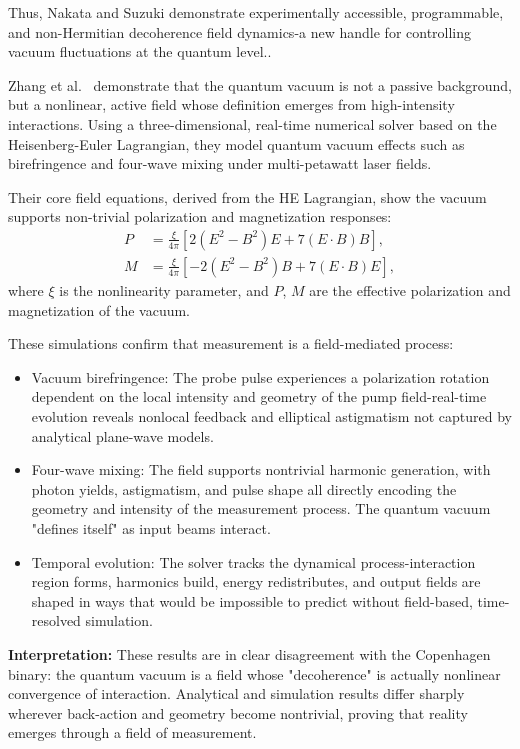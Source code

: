 Thus, Nakata and Suzuki demonstrate experimentally accessible, programmable, and non-Hermitian decoherence field dynamics-a new handle for controlling vacuum fluctuations at the quantum level.\cite{nakata_non-hermitian_2024}.

Zhang et al.~\cite{ZhangVacuum2025} demonstrate that the quantum vacuum is not a passive background, but a nonlinear, active field whose definition emerges from high-intensity interactions. Using a three-dimensional, real-time numerical solver based on the Heisenberg-Euler Lagrangian, they model quantum vacuum effects such as birefringence and four-wave mixing under multi-petawatt laser fields.

Their core field equations, derived from the HE Lagrangian, show the vacuum supports non-trivial polarization and magnetization responses:
\begin{align}
P &= \frac{\xi}{4\pi} \left[2(E^2 - B^2)E + 7(E \cdot B)B \right], \\
M &= \frac{\xi}{4\pi} \left[-2(E^2 - B^2)B + 7(E \cdot B)E \right],
\end{align}
where $\xi$ is the nonlinearity parameter, and $P$, $M$ are the effective polarization and magnetization of the vacuum.

These simulations confirm that measurement is a field-mediated process:
\begin{itemize}
    \item Vacuum birefringence: The probe pulse experiences a polarization rotation dependent on the local intensity and geometry of the pump field-real-time evolution reveals nonlocal feedback and elliptical astigmatism not captured by analytical plane-wave models.
    \item Four-wave mixing: The field supports nontrivial harmonic generation, with photon yields, astigmatism, and pulse shape all directly encoding the geometry and intensity of the measurement process. The quantum vacuum "defines itself" as input beams interact.
    \item Temporal evolution: The solver tracks the dynamical process-interaction region forms, harmonics build, energy redistributes, and output fields are shaped in ways that would be impossible to predict without field-based, time-resolved simulation.
\end{itemize}

\textbf{Interpretation:}  
These results are in clear disagreement with the Copenhagen binary: the quantum vacuum is a field whose "decoherence" is actually nonlinear convergence of interaction. Analytical and simulation results differ sharply wherever back-action and geometry become nontrivial, proving that reality emerges through a field of measurement.

